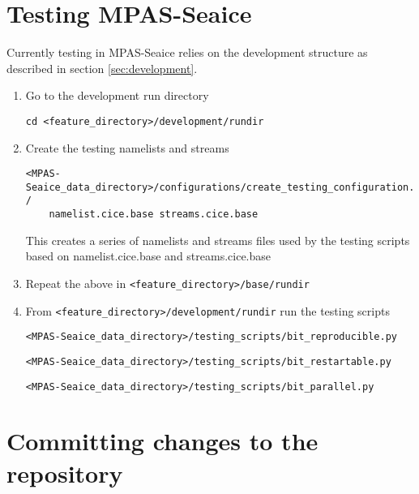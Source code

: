 \documentclass{article}
\begin{document}

\section{Testing MPAS-Seaice}
\label{sec:testing}

Currently testing in MPAS-Seaice relies on the development structure as described in section \ref{sec:development}.

\begin{enumerate}

\item Go to the development run directory

\verb+cd <feature_directory>/development/rundir+

\item Create the testing namelists and streams

\begin{verbatim}
<MPAS-Seaice_data_directory>/configurations/create_testing_configuration.py /
    namelist.cice.base streams.cice.base
\end{verbatim}

This creates a series of namelists and streams files used by the testing scripts based on namelist.cice.base and streams.cice.base

\item Repeat the above in \verb+<feature_directory>/base/rundir+

\item From \verb+<feature_directory>/development/rundir+ run the testing scripts

\verb+<MPAS-Seaice_data_directory>/testing_scripts/bit_reproducible.py+

\verb+<MPAS-Seaice_data_directory>/testing_scripts/bit_restartable.py+

\verb+<MPAS-Seaice_data_directory>/testing_scripts/bit_parallel.py+

\end{enumerate}


\section{Committing changes to the repository}
\label{sec:committing}
\end{document}
